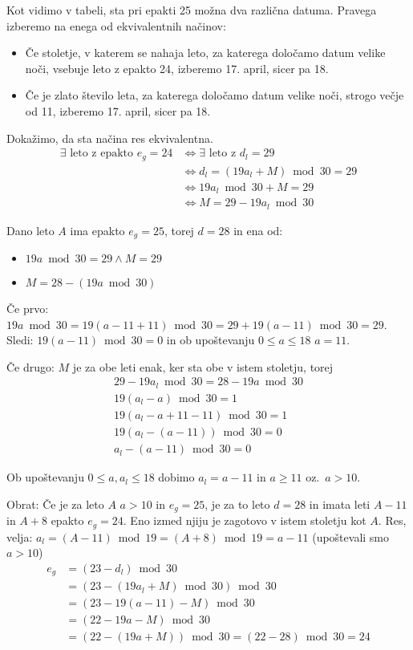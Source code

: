 \documentclass[a4paper,12pt]{article}
\begin{document}
Kot vidimo v tabeli, sta pri epakti 25 možna dva različna datuma. 
Pravega izberemo na enega od ekvivalentnih načinov:
\begin{itemize}
    \item Če stoletje, v katerem se nahaja leto, za katerega določamo datum velike 
        noči, vsebuje leto z epakto 24, izberemo 17. april, sicer pa 18.
    \item Če je zlato število leta, za katerega določamo datum velike noči, strogo 
        večje od 11, izberemo 17. april, sicer pa 18.
\end{itemize}

Dokažimo, da sta načina res ekvivalentna. %
\begin{align*}
    \exists \text{ leto z epakto } e_g = 24 &\Leftrightarrow \exists \text{ leto z } d_l = 29 \\
    &\Leftrightarrow d_l = (19 a_l + M) \bmod 30 = 29 \\
    &\Leftrightarrow 19 a_l \bmod 30 + M = 29 \\
    &\Leftrightarrow M = 29 - 19 a_l \bmod 30
\end{align*}

Dano leto $A$ ima epakto $e_g = 25$, torej $d = 28$ in ena od:
\begin{itemize}
    \item $19 a \bmod 30 = 29 \land M = 29$
    \item $M = 28 - (19 a \bmod 30)$
\end{itemize}

Če prvo: $19 a \bmod 30 = 19 (a - 11 + 11) \bmod 30 = 29 + 19 (a - 11) \bmod 30 = 29$.
Sledi: $19 (a - 11) \bmod 30 = 0$ in ob upoštevanju $0 \leq a \leq 18$ $a=11$.

Če drugo: $M$ je za obe leti enak, ker sta obe v istem stoletju, torej
\begin{align*}
    29 - 19 a_l \bmod 30 = 28 - 19 a \bmod 30 \\
    19 (a_l - a) \bmod 30 = 1 \\
    19 (a_l - a + 11 - 11) \bmod 30 = 1 \\
    19 (a_l - (a - 11)) \bmod 30 = 0 \\
    a_l - (a - 11) \bmod 30 = 0
\end{align*}

Ob upoštevanju $0 \leq a, a_l \leq 18$ dobimo $a_l = a - 11$ in $a \geq 11$ oz.\ $a > 10$.

Obrat: Če je za leto $A$ $a > 10$ in $e_g = 25$, je za to leto $d = 28$ in imata leti 
$A - 11$ in $A + 8$ epakto $e_g = 24$.
Eno izmed njiju je zagotovo v istem stoletju kot $A$.
Res, velja: $a_l = (A - 11) \bmod 19 = (A + 8) \bmod 19 = a - 11$ (upoštevali smo $a > 10$)
\begin{align*}
    e_g &= (23 - d_l) \bmod 30 \\
        &= (23 - (19 a_l + M) \bmod 30) \bmod 30 \\
        &= (23 - 19 (a - 11) - M) \bmod 30 \\
        &= (22 - 19 a - M) \bmod 30 \\
        &= (22 - (19 a + M)) \bmod 30 = (22 - 28) \bmod 30 = 24
\end{align*}
\end{document}
